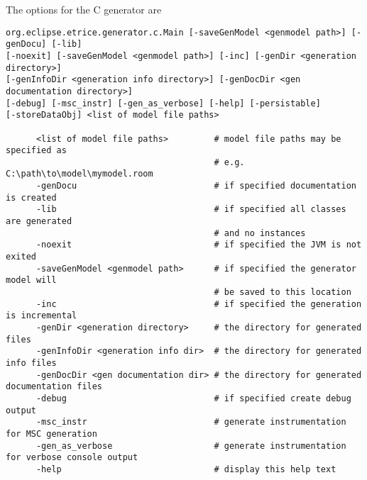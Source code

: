 The options for the C generator are

\begin{verbatim}
org.eclipse.etrice.generator.c.Main [-saveGenModel <genmodel path>] [-genDocu] [-lib]
[-noexit] [-saveGenModel <genmodel path>] [-inc] [-genDir <generation directory>]
[-genInfoDir <generation info directory>] [-genDocDir <gen documentation directory>]
[-debug] [-msc_instr] [-gen_as_verbose] [-help] [-persistable]
[-storeDataObj] <list of model file paths>

      <list of model file paths>         # model file paths may be specified as
                                         # e.g. C:\path\to\model\mymodel.room
      -genDocu                           # if specified documentation is created
      -lib                               # if specified all classes are generated
                                         # and no instances
      -noexit                            # if specified the JVM is not exited
      -saveGenModel <genmodel path>      # if specified the generator model will
                                         # be saved to this location
      -inc                               # if specified the generation is incremental
      -genDir <generation directory>     # the directory for generated files
      -genInfoDir <generation info dir>  # the directory for generated info files
      -genDocDir <gen documentation dir> # the directory for generated documentation files
      -debug                             # if specified create debug output
      -msc_instr                         # generate instrumentation for MSC generation
      -gen_as_verbose                    # generate instrumentation for verbose console output
      -help                              # display this help text
\end{verbatim}
